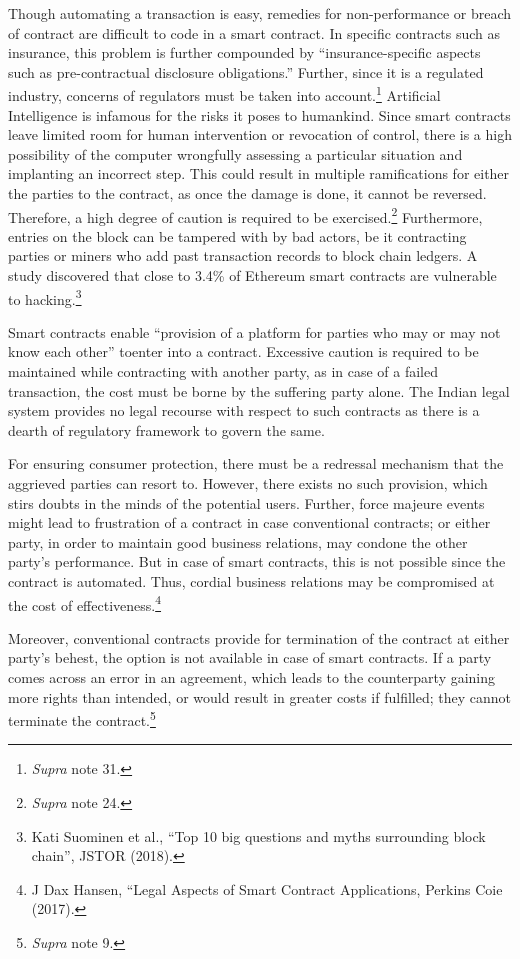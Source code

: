 \begin{multicols}{2}
\noi
Though automating a transaction is easy, remedies for non-performance or breach of contract
are difficult to code in a smart contract. In specific contracts such as insurance, this problem
is further compounded by “insurance-specific aspects such as pre-contractual disclosure
obligations.” Further, since it is a regulated industry, concerns of regulators must be taken
into account.\footnote{\textit{Supra} note 31.} Artificial Intelligence is infamous for the risks it poses to humankind. Since
smart contracts leave limited room for human intervention or revocation of control, there is a
high possibility of the computer wrongfully assessing a particular situation and implanting an
incorrect step. This could result in multiple ramifications for either the parties to the contract,
as once the damage is done, it cannot be reversed. Therefore, a high degree of caution is
required to be exercised.\footnote{\textit{Supra} note 24.} Furthermore, entries on the block can be tampered with by bad
actors, be it contracting parties or miners who add past transaction records to block chain
ledgers. A study discovered that close to 3.4\% of Ethereum smart contracts are vulnerable to
hacking.\footnote{Kati Suominen et al., “Top 10 big questions and myths surrounding block chain”, JSTOR (2018).}

\noi
Smart contracts enable “provision of a platform for parties who may or may not know each
other” to\break enter into a contract. Excessive caution is required to be maintained while
contracting with another party, as in case of a failed transaction, the cost must be borne by the suffering party alone. The Indian legal system provides no legal recourse with respect to such
contracts as there is a dearth of regulatory framework to govern the same. 

\noi
For ensuring consumer protection, there must be a redressal mechanism that the aggrieved
parties can resort to. However, there exists no such provision, which stirs doubts in the minds
of the potential users. Further, force majeure events might lead to frustration of a contract in
case conventional contracts; or either party, in order to maintain good business relations, may
condone the other party’s performance. But in case of smart contracts, this is not possible
since the contract is automated. Thus, cordial business relations may be compromised at the
cost of effectiveness.\footnote{J Dax Hansen, “Legal Aspects of Smart Contract Applications, Perkins Coie (2017).}

\noi
Moreover, conventional contracts provide for termination of the contract at either party’s
behest, the option is not available in case of smart contracts. If a party comes across an error
in an agreement, which leads to the counterparty gaining more rights than intended, or would
result in greater costs if fulfilled; they cannot terminate the contract.\footnote{\textit{Supra} note 9.}


\end{multicols}
